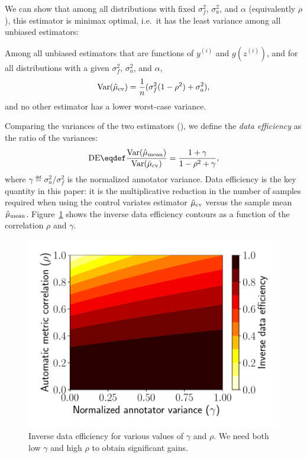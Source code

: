 We can show that among all distributions with
fixed $\sigma^2_f$, $\sigma^2_a$, and $\alpha$ (equivalently $\rho$), this estimator is minimax optimal, i.e.\ it has the least variance among all unbiased estimators:

\begin{theorem}
\label{thm:main}
Among all unbiased
  estimators that are functions of $y^{(i)}$ and $g(z^{(i)})$, and for all distributions with a given $\sigma^2_f$, $\sigma^2_a$, and $\alpha$,
\begin{align}
  \label{eqn:varcontrol}
  \operatorname{Var}(\hat \mu_\text{cv}) = \frac{1}{n} (\sigma^2_f (1 - \rho^2) + \sigma^2_a),
\end{align}
and no other estimator has a lower worst-case variance.
\end{theorem}

Comparing the variances of the two estimators (),
we define the \emph{data efficiency} as the ratio of the variances:
\begin{align}
\DE \eqdef \frac{\Var(\musimple)}{\Var(\mucontrol)} = \frac{1 + \gamma}{1-\rho^2 + \gamma},
\end{align}
where $\gamma \eqdef \sigma^2_a / \sigma^2_f$ is the normalized annotator variance.
Data efficiency is the key quantity in this paper:
  it is the multiplicative reduction in the number of samples required
  when using the control variates estimator $\hat \mu_\text{cv}$ versus the sample mean $\hat \mu_\text{mean}$.
Figure~\ref{fig:savings} shows the inverse data efficiency contours as a function of the correlation $\rho$
and $\gamma$.

\begin{figure}
\centering
  \includegraphics[width=0.8\columnwidth]{figures/savings}
  \caption[Inverse data efficiency with the control variates estimator]  {\label{fig:savings} Inverse data efficiency for various values of
  $\gamma$ and $\rho$.  We need both low $\gamma$ and high $\rho$ to obtain
  significant gains.
  }
\end{figure}

